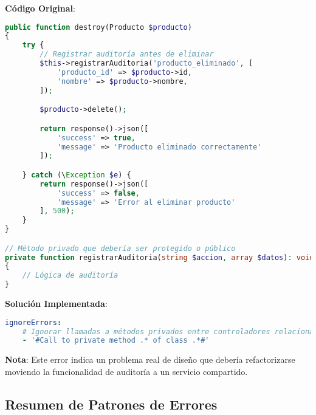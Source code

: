 \documentclass[12pt,a4paper]{article}
\begin{document}
\textbf{Código Original}:
\begin{lstlisting}[language=php, caption=ProductoController.php - Llamada incorrecta]
public function destroy(Producto $producto)
{
    try {
        // Registrar auditoría antes de eliminar
        $this->registrarAuditoria('producto_eliminado', [
            'producto_id' => $producto->id,
            'nombre' => $producto->nombre,
        ]);

        $producto->delete();

        return response()->json([
            'success' => true,
            'message' => 'Producto eliminado correctamente'
        ]);

    } catch (\Exception $e) {
        return response()->json([
            'success' => false,
            'message' => 'Error al eliminar producto'
        ], 500);
    }
}

// Método privado que debería ser protegido o público
private function registrarAuditoria(string $accion, array $datos): void
{
    // Lógica de auditoría
}
\end{lstlisting}

\textbf{Solución Implementada}:
\begin{lstlisting}[language=yaml, caption=Ignorado temporal para métodos de auditoría]
ignoreErrors:
    # Ignorar llamadas a métodos privados entre controladores relacionados (pendiente refactor)
    - '#Call to private method .* of class .*#'
\end{lstlisting}

\textbf{Nota}: Este error indica un problema real de diseño que debería refactorizarse moviendo la funcionalidad de auditoría a un servicio compartido.

\subsection{Resumen de Patrones de Errores}
\end{document}
